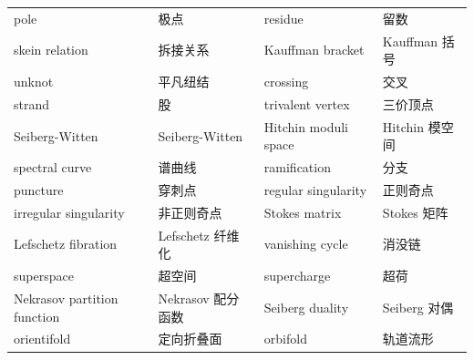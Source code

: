 \begin{longtable}{p{}p{}p{}p{}}
pole & 极点 & residue & 留数 \\
skein relation & 拆接关系 & Kauffman bracket & Kauffman 括号 \\
unknot & 平凡纽结 & crossing & 交叉 \\
strand & 股 & trivalent vertex & 三价顶点 \\
Seiberg-Witten & Seiberg-Witten & Hitchin moduli space & Hitchin 模空间 \\
spectral curve & 谱曲线 & ramification & 分支 \\
puncture & 穿刺点 & regular singularity & 正则奇点 \\
irregular singularity & 非正则奇点 & Stokes matrix & Stokes 矩阵 \\
Lefschetz fibration & Lefschetz 纤维化 & vanishing cycle & 消没链 \\
superspace & 超空间 & supercharge & 超荷 \\
Nekrasov partition function & Nekrasov 配分函数 & Seiberg duality & Seiberg 对偶 \\
orientifold & 定向折叠面 & orbifold & 轨道流形 \\
\bottomrule
\end{longtable}
